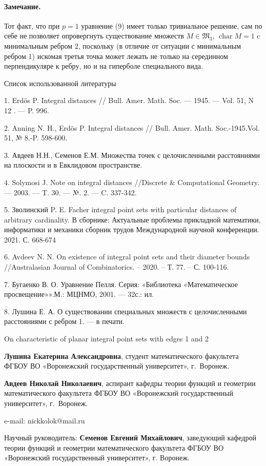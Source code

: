 \documentclass[a4paper,openbib]{article}
\begin{document}
\paragraph{Замечание.}
Тот факт, что при $p=1$ уравнение (9) имеет только тривиальное решение,
сам по себе не позволяет опровергнуть существование множеств
$M\in\mathfrak{M}_3$, $\operatorname{char}M=1$ c минимальным ребром 2,
поскольку (в отличие от ситуации с минимальным ребром 1)
искомая третья точка может лежать не только на серединном перпендикуляре к ребру,
но и на гиперболе специального вида.

Список использованной литературы

1. Erdös P. Integral distances // Bull. Amer. Math. Soc. --- 1945. --- Vol. 51, N 12 . ---
P. 996.

2. Anning N. H., Erdös P. Integral distances // Bull. Amer. Math. Soc.-1945.Vol. 51, № 8.-P. 598-600.

3. Авдеев Н.Н., Семенов Е.М. Множества точек с целочисленными расстояниями на плоскости и в Евклидовом пространстве.

4. Solymosi J. Note on integral distances //Discrete \& Computational Geometry. --- 2003. --- T. 30. --- №. 2. --- C. 337-342.

5. Зволинский P. E. Facher integral point sets with particular distances of arbitrary cardinality.
В сборнике: Актуальные проблемы прикладной математики, информатики и механики сборник трудов Международной научной конференции. 2021. С. 668-674

6. Avdeev N. N. On existence of integral point sets and their diameter bounds //Australasian Journal of Combinatorics. – 2020. – Т. 77. – С. 100-116.

7. Бугаенко В. О. Уравнение Пелля. Серия: «Библиотека «Математическое просвещение»».М.: МЦНМО, 2001. --- 32с.: ил.

8. Лушина Е. А. О существовании специальных множеств с целочисленными расстояниями с ребром 1. --- в печати.

On characteristic of planar integral point sets with edges 1 and 2

{\bf Лушина Екатерина Александровна}, студент математического факультета ФГБОУ ВО «Воронежский государственный университет», г.~Воронеж.

{\bf Авдеев Николай Николаевич}, аспирант кафедры теории функций и геометрии математического факультета ФГБОУ ВО «Воронежский государственный университет», г.~Воронеж.

e-mail: nickkolok@mail.ru

Научный руководитель:
{\bf Семенов Евгений Михайлович},
заведующий кафедрой теории функций и геометрии математического факультета ФГБОУ ВО «Воронежский государственный
университет», г. Воронеж.
\end{document}
